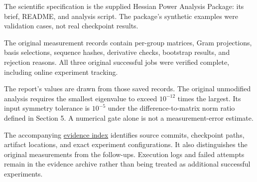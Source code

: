 \documentclass[
  14pt,
  letterpaper,
]{extarticle}
\begin{document}
The scientific specification is the supplied Hessian Power Analysis
Package: its brief, README, and analysis script. The package's synthetic
examples were validation cases, not real checkpoint results.

The original measurement records contain per-group matrices, Gram
projections, basis selections, sequence hashes, derivative checks,
bootstrap results, and rejection reasons. All three original successful
jobs were verified complete, including online experiment tracking.

The report's values are drawn from those saved records. The original
unmodified analysis requires the smallest eigenvalue to exceed
\(10^{-12}\) times the largest. Its input symmetry tolerance is
\(10^{-5}\) under the difference-to-matrix norm ratio defined in Section
5. A numerical gate alone is not a measurement-error estimate.

The accompanying \href{evidence-index.md}{evidence index} identifies
source commits, checkpoint paths, artifact locations, and exact
experiment configurations. It also distinguishes the original
measurements from the follow-ups. Execution logs and failed attempts
remain in the evidence archive rather than being treated as additional
successful experiments.
\end{document}
